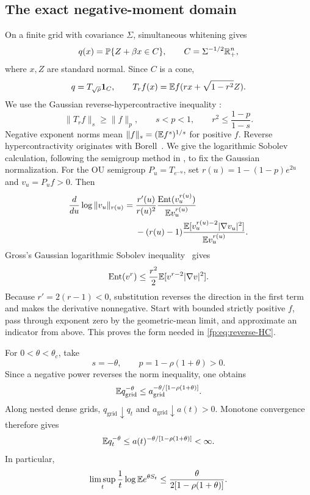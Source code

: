 \subsection{The exact negative-moment domain}
On a finite grid with covariance $\Sigma$, simultaneous whitening gives
\[
 q(x)=\mathbb P\{Z+\beta x\in C\},\qquad
 C=\Sigma^{-1/2}\mathbb R_+^n,
\]
where $x,Z$ are standard normal. Since $C$ is a cone,
\[
 q=T_{\sqrt\rho}\mathbf 1_C,
 \qquad T_rf(x)=\mathbb E f(rx+\sqrt{1-r^2}Z).
\]
We use the Gaussian reverse-hypercontractive inequality
\cite[Section~3.3, equation~(3.14)]{CDP}:
\begin{equation}\label{fp:eq:reverse-HC}
 \|T_rf\|_s\ge\|f\|_p,
 \qquad s<p<1,\qquad
 r^2\le\frac{1-p}{1-s}.
\end{equation}
Negative exponent norms mean $\|f\|_s=(\mathbb E f^s)^{1/s}$ for positive $f$.
Reverse hypercontractivity originates with Borell~\cite{Borell1982}.
We give the logarithmic Sobolev calculation, following the semigroup
method in \cite{MosselOleszkiewiczSen2013}, to fix the Gaussian
normalization. For the OU semigroup $P_u=T_{e^{-u}}$, set
$r(u)=1-(1-p)e^{2u}$ and
$v_u=P_uf>0$. Then
\begin{align*}
 \frac d{du}\log\|v_u\|_{r(u)}
 ={}&\frac{r'(u)}{r(u)^2}
       \frac{\operatorname{Ent}(v_u^{r(u)})}{\mathbb E v_u^{r(u)}}\\
 &-(r(u)-1)
       \frac{\mathbb E[v_u^{r(u)-2}|\nabla v_u|^2]}{\mathbb E v_u^{r(u)}}.
\end{align*}
Gross's Gaussian logarithmic Sobolev inequality~\cite{Gross1975} gives
\[
 \operatorname{Ent}(v^r)\le\frac{r^2}{2}\mathbb E[v^{r-2}|\nabla v|^2].
\]
Because $r'=2(r-1)<0$, substitution reverses the direction in the first term and makes the derivative nonnegative. Start with bounded strictly positive $f$, pass through exponent zero by the geometric-mean limit, and approximate an indicator from above. This proves the form needed in \eqref{fp:eq:reverse-HC}.

For $0<\theta<\theta_c$, take
\[
 s=-\theta,\qquad p=1-\rho(1+\theta)>0.
\]
Since a negative power reverses the norm inequality, one obtains
\[
 \mathbb E q_{\mathrm{grid}}^{-\theta}
 \le a_{\mathrm{grid}}^{-\theta/[1-\rho(1+\theta)]}.
\]
Along nested dense grids, $q_{\mathrm{grid}}\downarrow q_t$ and $a_{\mathrm{grid}}\downarrow a(t)>0$. Monotone convergence therefore gives
\begin{equation}\label{fp:eq:neg-bound}
 \mathbb E q_t^{-\theta}
 \le a(t)^{-\theta/[1-\rho(1+\theta)]}<\infty.
\end{equation}
In particular,
\begin{equation}\label{fp:eq:Lambda-upper}
 \limsup_t\frac1t\log\mathbb E e^{\theta S_t}
 \le\frac{\theta}{2[1-\rho(1+\theta)]}.
\end{equation}

